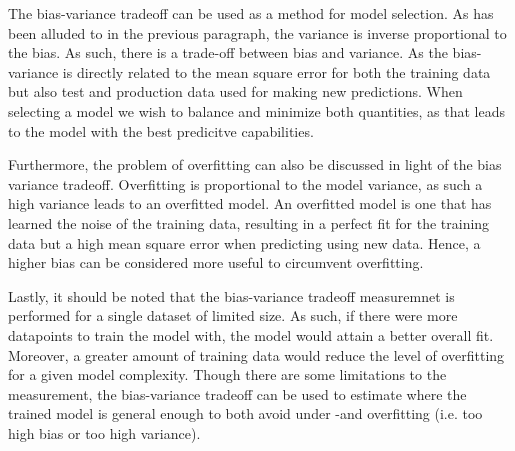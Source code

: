 \documentclass[11pt, a4paper]{article}
\begin{document}
The bias-variance tradeoff can be used as a method for model selection. As has been alluded to in the previous paragraph, the variance is inverse proportional to the bias. As such, there is a trade-off between bias and variance. As the bias-variance is directly related to the mean square error for both the training data but also test and production data used for making new predictions. When selecting a model we wish to balance and minimize both quantities, as that leads to the model with the best predicitve capabilities. \cite{Bishop2016}

Furthermore, the problem of overfitting can also be discussed in light of the bias variance tradeoff. Overfitting is proportional to the model variance, as such a high variance leads to an overfitted model. An overfitted model is one that has learned the noise of the training data, resulting in a perfect fit for the training data but a high mean square error when predicting using new data. Hence, a higher bias can be considered more useful to circumvent overfitting.

Lastly, it should be noted that the bias-variance tradeoff measuremnet is performed for a single dataset of limited size. As such, if there were more datapoints to train the model with, the model would attain a better overall fit. Moreover, a greater amount of training data would reduce the level of overfitting for a given model complexity. \cite{Bishop2016} Though there are some limitations to the measurement, the bias-variance tradeoff can be used to estimate where the trained model is general enough to both avoid under -and overfitting (i.e. too high bias or too high variance).



\end{document}
